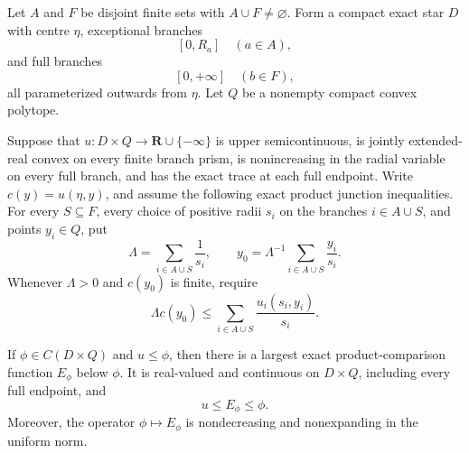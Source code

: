 \begin{lemma}
\label{lem:p071-finite-exact-star-polyhedral-insertion}
Let \(A\) and \(F\) be disjoint finite sets with \(A\cup F\ne\varnothing\).
Form a compact exact star \(D\) with centre \(\eta\), exceptional branches
\[
                  [0,R_a]\quad(a\in A),
\]
and full branches
\[
                  [0,+\infty]\quad(b\in F),
\]
all parameterized outwards from \(\eta\).  Let \(Q\) be a nonempty compact
convex polytope.

Suppose that \(u:D\times Q\to\mathbf R\cup\{-\infty\}\) is upper
semicontinuous, is jointly extended-real convex on every finite branch
prism, is nonincreasing in the radial variable on every full branch, and
has the exact trace at each full endpoint.  Write
\(c(y)=u(\eta,y)\), and assume the following exact product junction
inequalities.  For every \(S\subseteq F\), every choice of positive radii
\(s_i\) on the branches \(i\in A\cup S\), and points \(y_i\in Q\), put
\[
 \Lambda=\sum_{i\in A\cup S}\frac1{s_i},
 \qquad
 y_0=\Lambda^{-1}\sum_{i\in A\cup S}\frac{y_i}{s_i}.
\]
Whenever \(\Lambda>0\) and \(c(y_0)\) is finite, require
\begin{equation}
 \Lambda c(y_0)\leq
       \sum_{i\in A\cup S}\frac{u_i(s_i,y_i)}{s_i}.
 \label{eq:p071-finite-exact-star-junction}
\end{equation}

If \(\phi\in C(D\times Q)\) and \(u\leq\phi\), then there is a largest
exact product-comparison function \(E_\phi\) below \(\phi\).  It is
real-valued and continuous on \(D\times Q\), including every full endpoint,
and
\begin{equation}
                              u\leq E_\phi\leq\phi.
 \label{eq:p071-finite-exact-star-insertion}
\end{equation}
Moreover, the operator \(\phi\mapsto E_\phi\) is nondecreasing and
nonexpanding in the uniform norm.
\end{lemma}

